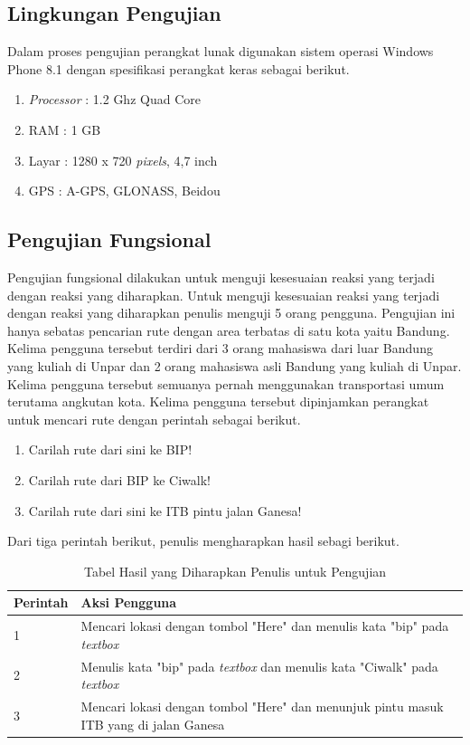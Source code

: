 \subsection{Lingkungan Pengujian}
\label{lab:Lingkungan Pengujian}
\hspace{0.5cm} Dalam proses pengujian perangkat lunak digunakan sistem operasi Windows Phone 8.1 dengan spesifikasi perangkat keras sebagai berikut.
\begin{enumerate}
	\item \textit{Processor} : 1.2 Ghz Quad Core
	\item RAM : 1 GB
	\item Layar : 1280 x 720 \textit{pixels}, 4,7 inch
	\item GPS : A-GPS, GLONASS, Beidou
\end{enumerate}

\subsection{Pengujian Fungsional}
\label{lab:Pengujian Fungsional}
\hspace{0.5cm} Pengujian fungsional dilakukan untuk menguji kesesuaian reaksi yang terjadi dengan reaksi yang diharapkan. Untuk menguji kesesuaian reaksi yang terjadi dengan reaksi yang diharapkan penulis menguji 5 orang pengguna. Pengujian ini hanya sebatas pencarian rute dengan area terbatas di satu kota yaitu Bandung. Kelima pengguna tersebut terdiri dari 3 orang mahasiswa dari luar Bandung yang kuliah di Unpar dan 2 orang mahasiswa asli Bandung yang kuliah di Unpar. Kelima pengguna tersebut semuanya pernah menggunakan transportasi umum terutama angkutan kota. Kelima pengguna tersebut dipinjamkan perangkat untuk mencari rute dengan perintah sebagai berikut. 
\begin{enumerate}
	\item Carilah rute dari sini ke BIP!
	\item Carilah rute dari BIP ke Ciwalk!
	\item Carilah rute dari sini ke ITB pintu jalan Ganesa!
\end{enumerate}

Dari tiga perintah berikut, penulis mengharapkan hasil sebagi berikut.
\begin{table}[h]
	\centering
		\begin{tabular}{|p{2cm}|p{10cm}|}\hline
				Perintah & Aksi Pengguna \\ \hline
				1 & Mencari lokasi dengan tombol "Here" dan menulis kata "bip" pada \textit{textbox} \\ \hline
				2 & Menulis kata "bip" pada \textit{textbox} dan menulis kata "Ciwalk" pada \textit{textbox} \\ \hline
				3 & Mencari lokasi dengan tombol "Here" dan menunjuk pintu masuk ITB yang di jalan Ganesa \\ \hline
		\end{tabular}
	\caption{Tabel Hasil yang Diharapkan Penulis untuk Pengujian}
	\label{tab:TabelHasilyangdiharapkanPenulis}
\end{table}

